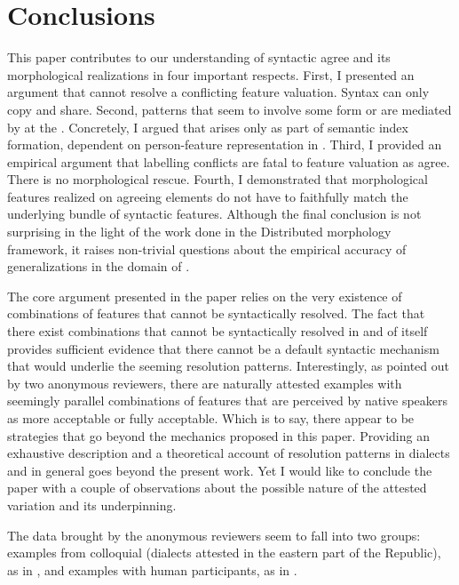 \documentclass[output=paper,modfontsnewtxmath,hidelinks]{langscibook}
\begin{document}
\section{Conclusions}

This paper contributes to our understanding of syntactic agree and its morphological realizations in four important respects. First, I presented an argument that  cannot resolve a conflicting feature valuation. Syntax can only copy and share. Second, patterns that seem to involve some form or  are mediated by  at the . Concretely, I argued that  arises only as part of semantic index formation, dependent on person-feature representation in . Third, I provided an empirical argument that labelling conflicts are fatal to feature valuation as agree. There is no morphological rescue. Fourth, I demonstrated that morphological features realized on agreeing elements do not have to faithfully match the underlying bundle of syntactic features. Although the final conclusion is not surprising in the light of the work done in the Distributed morphology framework, it raises non-trivial questions about the empirical accuracy of generalizations in the domain of . 

The core argument presented in the paper relies on the very existence of combinations of features that cannot be syntactically resolved. The fact that there exist combinations that cannot be syntactically resolved in and of itself provides sufficient evidence that there cannot be a default syntactic mechanism that would underlie the seeming resolution patterns. Interestingly, as pointed out by two anonymous reviewers, there are naturally attested examples with seemingly parallel combinations of features that are perceived by native speakers as more acceptable or fully acceptable. Which is to say, there appear to be  strategies that go beyond the mechanics proposed in this paper. Providing an exhaustive description and a theoretical account of  resolution patterns in  dialects and  in general  goes beyond the present work. Yet I would like to conclude the paper with a couple of observations about the possible nature of the attested variation and its underpinning.

The data brought by the anonymous reviewers seem to fall into two groups: examples from colloquial  (dialects attested in the eastern part of the  Republic), as in , and examples with human participants, as in .
\end{document}
